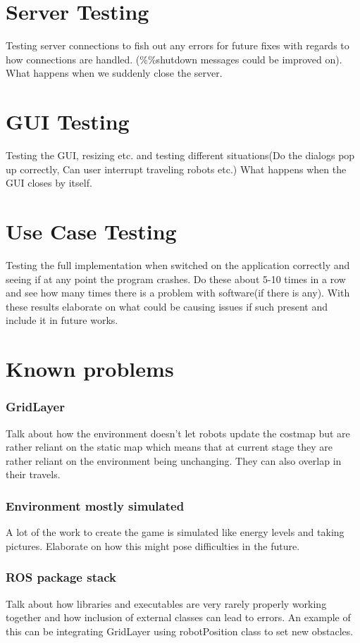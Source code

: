 \documentclass{report}
\begin{document}
    \section{Server Testing}
      Testing server connections to fish out any errors for future fixes with regards to how connections are handled. (\%\%shutdown messages could be improved on). What happens when we suddenly close the server.
    \section{GUI Testing}
      Testing the GUI, resizing etc. and testing different situations(Do the dialogs pop up correctly, Can user interrupt traveling robots etc.) What happens when the GUI closes by itself.
    \section{Use Case Testing}
      Testing the full implementation when switched on the application correctly and seeing if at any point the program crashes. Do these about 5-10 times in a row and see how many times there is a problem with software(if there is any). With these results elaborate on what could be causing issues if such present and include it in future works.
    \section{Known problems}
      \subsubsection{GridLayer}
        Talk about how the environment doesn't let robots update the costmap but are rather reliant on the static map which means that at current stage they are rather reliant on the environment being unchanging. They can also overlap in their travels.
      \subsubsection{Environment mostly simulated}
        A lot of the work to create the game is simulated like energy levels and taking pictures. Elaborate on how this might pose difficulties in the future.
      \subsubsection{ROS package stack}
        Talk about how libraries and executables are very rarely properly working together and how inclusion of external classes can lead to errors. An example of this can be integrating GridLayer using robotPosition class to set new obstacles.
\end{document}
